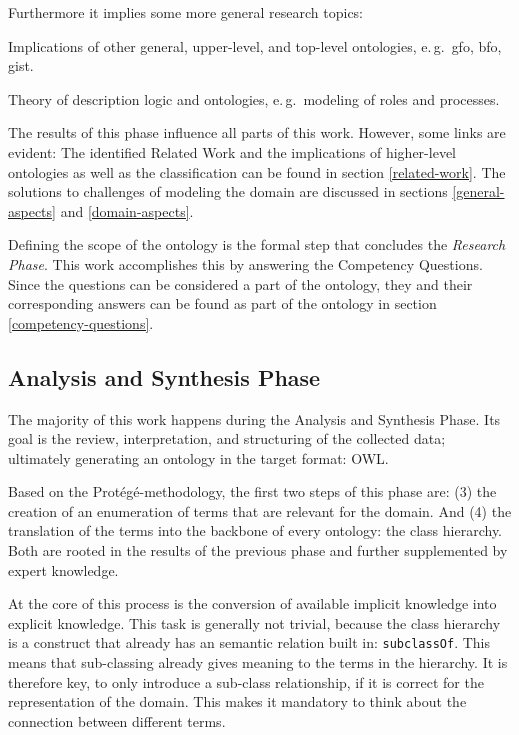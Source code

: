 \documentclass[a4paper, DIV=13, BCOR=0cm]{scrbook}
\newcommand{\eg}{e.\,g.\ }
\newcommand{\relation}[1]{\texttt{#1}}
\begin{document}
Furthermore it implies some more general research topics:
\begin{compactitem}
	\item Implications of other general, upper-level, and top-level ontologies, \eg \gls{gfo}, \gls{bfo}, \gls{gist}.
	\item Theory of description logic and ontologies, \eg modeling of roles and processes.
\end{compactitem}

The results of this phase influence all parts of this work. However, some links are evident: The identified Related Work and the implications of higher-level ontologies as well as the classification can be found in section \ref{related-work}. The solutions to challenges of modeling the domain are discussed in sections \ref{general-aspects} and \ref{domain-aspects}.

Defining the scope of the ontology is the formal step that concludes the \textit{Research Phase}. This work accomplishes this by answering the Competency Questions. Since the questions can be considered a part of the ontology, they and their corresponding answers can be found as part of the ontology in section \ref{competency-questions}.

\subsection{Analysis and Synthesis Phase }
\label{analysis}
The majority of this work happens during the Analysis and Synthesis Phase. Its goal is the review, interpretation, and structuring of the collected data; ultimately generating an ontology in the target format: OWL.

Based on the Protégé-methodology, the first two steps of this phase are: (3) the creation of an enumeration of terms that are relevant for the domain. And (4) the translation of the terms into the backbone of every ontology: the class hierarchy. Both are rooted in the results of the previous phase and further supplemented by expert knowledge.

At the core of this process is the conversion of available implicit knowledge into explicit knowledge. This task is generally not trivial, because the class hierarchy is a construct that already has an semantic relation built in: \relation{subclassOf}. This means that sub-classing already gives meaning to the terms in the hierarchy. It is therefore key, to only introduce a sub-class relationship, if it is correct for the representation of the domain. This makes it mandatory to think about the connection between different terms.
\end{document}
